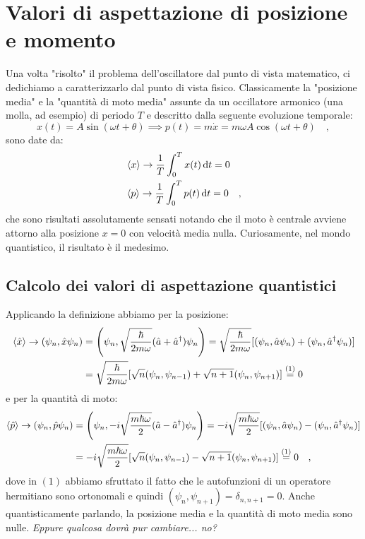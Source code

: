 \section{Valori di aspettazione di posizione e momento}
Una volta "risolto" il problema dell'oscillatore dal punto di vista matematico, ci dedichiamo a caratterizzarlo dal punto di vista fisico. Classicamente la "posizione media" e la "quantità di moto media" assunte da un occillatore armonico (una molla, ad esempio) di periodo $T$ e descritto dalla seguente evoluzione temporale:
\[
    x(t) = A\sin(\omega t + \theta) \implies p(t) = m\dot{x} = m\omega A \cos(\omega t + \theta) \quad,
\] 
sono date da:
\[
    \begin{aligned}
        &\left\langle x \right\rangle \to \frac{1}{T}\int_0^T x(t)\dd{t} = 0\\
        &\left\langle p \right\rangle \to \frac{1}{T}\int_0^T p(t)\dd{t} = 0 \quad,
    \end{aligned}
\]
che sono risultati assolutamente sensati notando che il moto è centrale avviene attorno alla posizione $x = 0$ con velocità media nulla. Curiosamente, nel mondo quantistico, il risultato è il medesimo.

\subsection{Calcolo dei valori di aspettazione quantistici}
Applicando la definizione abbiamo per la posizione:
\[
    \begin{aligned}
        \left\langle \hat{x} \right\rangle \to (\psi_n, \hat{x}\psi_n) &= \left( \psi_n, \sqrt{\frac{\hbar}{2m\omega}} (\hat{a}+\hat{a}^\dagger)\psi_n \right) = \sqrt{\frac{\hbar}{2m\omega}} [(\psi_n, \hat{a}\psi_n) + (\psi_n, \hat{a}^\dagger\psi_n)]\\
        &= \sqrt{\frac{\hbar}{2m\omega}} [\sqrt{n}(\psi_n, \psi_{n-1}) + \sqrt{n+1}(\psi_n, \psi_{n+1})] \overset{(1)}{=} 0
    \end{aligned}
\]
e per la quantità di moto:
\[
    \begin{aligned}
        \left\langle \hat{p} \right\rangle \to (\psi_n, \hat{p}\psi_n) &= \left( \psi_n, -i\sqrt{\frac{m\hbar\omega}{2}} (\hat{a}-\hat{a}^\dagger)\psi_n \right) = -i\sqrt{\frac{m\hbar\omega}{2}} [(\psi_n, \hat{a}\psi_n) - (\psi_n, \hat{a}^\dagger\psi_n)]\\
        &= -i\sqrt{\frac{m\hbar\omega}{2}} [\sqrt{n}(\psi_n, \psi_{n-1}) - \sqrt{n+1}(\psi_n, \psi_{n+1})] \overset{(1)}{=} 0 \quad,
    \end{aligned}
\]
dove in $(1)$ abbiamo sfruttato il fatto che le autofunzioni di un operatore hermitiano sono ortonomali e quindi $(\psi_n, \psi_{n+1}) = \delta_{n,n+1} = 0$. Anche quantisticamente parlando, la posizione media e la quantità di moto media sono nulle. \emph{Eppure qualcosa dovrà pur cambiare... no?}

